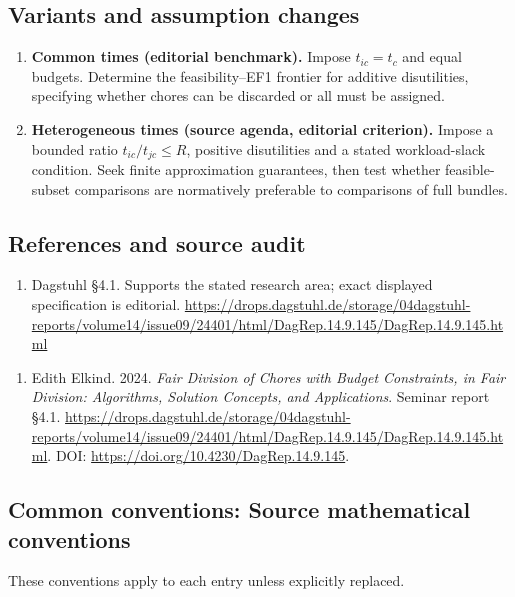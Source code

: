 \documentclass[11pt,a4paper]{article}
\begin{document}
\subsection*{Variants and assumption changes}
\begin{enumerate}
\item \textbf{Common times (editorial benchmark).} Impose \(t_{ic}=t_c\) and equal budgets. Determine the feasibility--EF1 frontier for additive disutilities, specifying whether chores can be discarded or all must be assigned.
\item \textbf{Heterogeneous times (source agenda, editorial criterion).} Impose a bounded ratio \(t_{ic}/t_{jc}\le R\), positive disutilities and a stated workload-slack condition. Seek finite approximation guarantees, then test whether feasible-subset comparisons are normatively preferable to comparisons of full bundles.
\end{enumerate}
\subsection*{References and source audit}
\begin{enumerate}
\item Dagstuhl §4.1. Supports the stated research area; exact displayed specification is editorial. \url{https://drops.dagstuhl.de/storage/04dagstuhl-reports/volume14/issue09/24401/html/DagRep.14.9.145/DagRep.14.9.145.html}
\end{enumerate}
\begin{enumerate}\raggedright
\item\hypertarget{definitions:source:30007559:1}{} Edith Elkind. 2024. \emph{Fair Division of Chores with Budget Constraints, in Fair Division: Algorithms, Solution Concepts, and Applications}. Seminar report §4.1.
\url{https://drops.dagstuhl.de/storage/04dagstuhl-reports/volume14/issue09/24401/html/DagRep.14.9.145/DagRep.14.9.145.html}.
DOI: \url{https://doi.org/10.4230/DagRep.14.9.145}.
\end{enumerate}

\subsection*{Common conventions: Source mathematical conventions}

These conventions apply to each entry unless explicitly replaced.
\end{document}
